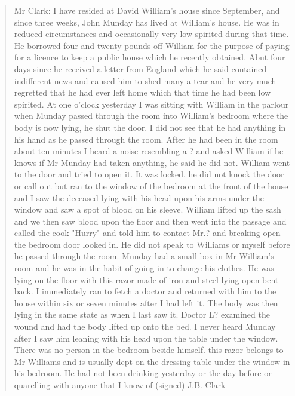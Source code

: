 \begin{quotation}
Mr Clark: I have resided at David William's house since September, and since three weeks, John Munday has lived at William's house. He was in reduced circumstances and occasionally very low spirited during that time. He borrowed four and twenty pounds off William for the purpose of paying for a licence to keep a public house which he recently obtained. Abut four days since he received a letter from England which he said contained indifferent news and caused him to shed many a tear and he very much regretted that he had ever left home which that time he had been low spirited. At one o'clock yesterday I was sitting with William in the parlour when Munday passed through the room into William's bedroom where the body is now lying, he shut the door. I did not see that he had anything in his hand as he passed through the room. After he had been in the room about ten minutes I heard a noise resembling a ? and asked William if he knows if Mr Munday had taken anything, he said he did not. William went to the door and tried to open it. It was locked, he did not knock the door or call out but ran to the window of the bedroom at the front of the house and I saw the deceased lying with his head upon his arms under the window and saw a spot of blood on his sleeve. William lifted up the sash and we then saw blood upon the floor and then went into the passage and called the cook "Hurry" and told him to contact Mr.? and breaking open the bedroom door looked in. He did not speak to Williams or myself before he passed through the room. Munday had a small box in Mr William's room and he was in the habit of going in to change his clothes. He was lying on the floor with this razor made of iron and steel lying open bent back. I immediately ran to fetch a doctor and returned with him to the house within six or seven minutes after I had left it. The body was then lying in the same state as when I last saw it. Doctor L? examined the wound and had the body lifted up onto the bed. I never heard Munday after I saw him leaning with his head upon the table under the window. There was no person in the bedroom beside himself. this razor belongs to Mr Williams and is usually dept on the dressing table under the window in his bedroom. He had not been drinking yesterday or the day before or quarelling with anyone that I know of (signed) J.B. Clark


\end{quotation}
